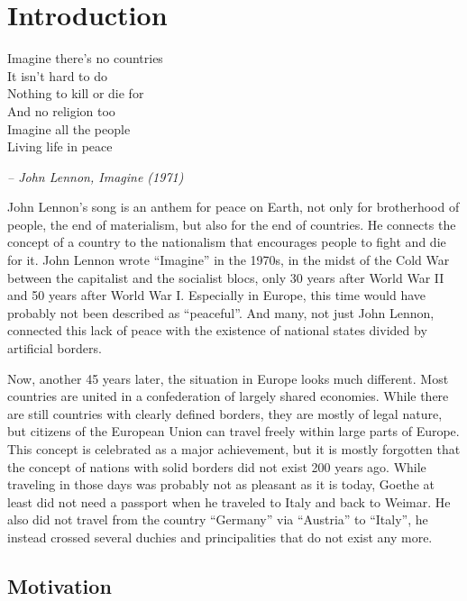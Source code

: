 
\chapter{Introduction} %
\label{cha:introduction}
\begin{large}
\begin{quoteit}
  Imagine there's no countries \\
  It isn't hard to do \\
  Nothing to kill or die for \\
  And no religion too \\
  Imagine all the people \\
  Living life in peace
\end{quoteit}
\end{large}
\hfill \textit{-- John Lennon, \emph{Imagine} (1971)}

John Lennon's song is an anthem for peace on Earth, not only for brotherhood of people, the end of materialism, but also for the end of countries. He connects the concept of a country to the nationalism that encourages people to fight and die for it. John Lennon wrote ``Imagine'' in the 1970s, in the midst of the Cold War between the capitalist and the socialist blocs, only 30 years after World War II and 50 years after World War I. Especially in Europe, this time would have probably not been described as ``peaceful''. And many, not just John Lennon, connected this lack of peace with the existence of national states divided by artificial borders.

Now, another 45 years later, the situation in Europe looks much different. Most countries are united in a confederation of largely shared economies. While there are still countries with clearly defined borders, they are mostly of legal nature, but citizens of the European Union can travel freely within large parts of Europe. This concept is celebrated as a major achievement, but it is mostly forgotten that the concept of nations with solid borders did not exist 200 years ago. While traveling in those days was probably not as pleasant as it is today, Goethe at least did not need a passport when he traveled to Italy and back to Weimar. He also did not travel from the country ``Germany'' via ``Austria'' to ``Italy'', he instead crossed several duchies and principalities that do not exist any more.

\section{Motivation} %
\label{sec:motivation}

